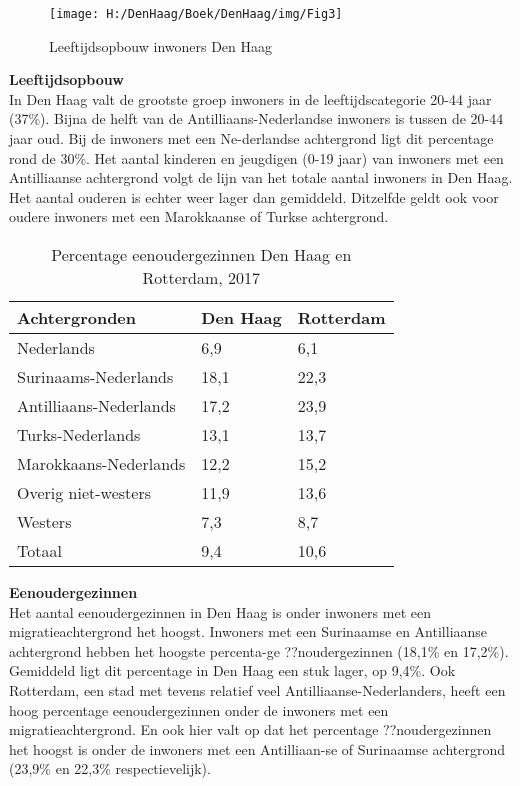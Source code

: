 \documentclass[]{book}
\begin{document}
\begin{figure}
\texttt{[image: H:/DenHaag/Boek/DenHaag/img/Fig3]} \caption{Leeftijdsopbouw inwoners Den Haag}\label{fig:unnamed-chunk-3}
\end{figure}

\textbf{Leeftijdsopbouw}\\
In Den Haag valt de grootste groep inwoners in de leeftijdscategorie
20-44 jaar (37\%). Bijna de helft van de Antilliaans-Nederlandse
inwoners is tussen de 20-44 jaar oud. Bij de inwoners met een
Ne-derlandse achtergrond ligt dit percentage rond de 30\%. Het aantal
kinderen en jeugdigen (0-19 jaar) van inwoners met een Antilliaanse
achtergrond volgt de lijn van het totale aantal inwoners in Den Haag.
Het aantal ouderen is echter weer lager dan gemiddeld. Ditzelfde geldt
ook voor oudere inwoners met een Marokkaanse of Turkse achtergrond.

\begin{table}

\caption{\label{tab:table-aligned}Percentage eenoudergezinnen Den Haag en Rotterdam, 2017}
\centering
\begin{tabular}[t]{l|l|l}
\hline
Achtergronden & Den Haag & Rotterdam\\
\hline
Nederlands & 6,9 & 6,1\\
\hline
Surinaams-Nederlands & 18,1 & 22,3\\
\hline
Antilliaans-Nederlands & 17,2 & 23,9\\
\hline
Turks-Nederlands & 13,1 & 13,7\\
\hline
Marokkaans-Nederlands & 12,2 & 15,2\\
\hline
Overig niet-westers & 11,9 & 13,6\\
\hline
Westers & 7,3 & 8,7\\
\hline
Totaal & 9,4 & 10,6\\
\hline
\end{tabular}
\end{table}

\textbf{Eenoudergezinnen}\\
Het aantal eenoudergezinnen in Den Haag is onder inwoners met een
migratieachtergrond het hoogst. Inwoners met een Surinaamse en
Antilliaanse achtergrond hebben het hoogste percenta-ge ??noudergezinnen
(18,1\% en 17,2\%). Gemiddeld ligt dit percentage in Den Haag een stuk
lager, op 9,4\%. Ook Rotterdam, een stad met tevens relatief veel
Antilliaanse-Nederlanders, heeft een hoog percentage eenoudergezinnen
onder de inwoners met een migratieachtergrond. En ook hier valt op dat
het percentage ??noudergezinnen het hoogst is onder de inwoners met een
Antilliaan-se of Surinaamse achtergrond (23,9\% en 22,3\%
respectievelijk).
\end{document}

